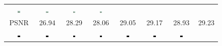 \documentclass[10pt,twocolumn,letterpaper]{article}
\begin{document}
\begin{figure} [tb]
\begin{tabular*}{\textwidth}{cccccccc}
 \includegraphics[width=0.12\textwidth]{fig/ed/42049[5-SRCNN].jpg} &
    \includegraphics[width=0.12\textwidth]{fig/ed/42049[6-A+].jpg} &
    \includegraphics[width=0.12\textwidth]{fig/ed/42049[7-JOR].jpg} &
    \includegraphics[width=0.12\textwidth]{fig/ed/42049[8-SRF].jpg} \\
    PSNR & 26.94 & 28.29 & 28.06 & 29.05 & 29.17 & 28.93 & 29.23 \\
 \includegraphics[width=0.12\textwidth]{fig/ed/42049[1-Original]_cbd.jpg} &
 \includegraphics[width=0.12\textwidth]{fig/ed/42049[2-Bicubic]_cbd.jpg} &
 \includegraphics[width=0.12\textwidth]{fig/ed/42049[3-Zeyde]_cbd.jpg} &
 \includegraphics[width=0.12\textwidth]{fig/ed/42049[4-ANR]_cbd.jpg} &
 \includegraphics[width=0.12\textwidth]{fig/ed/42049[5-SRCNN]_cbd.jpg} &
 \includegraphics[width=0.12\textwidth]{fig/ed/42049[6-A+]_cbd.jpg} &
 \includegraphics[width=0.12\textwidth]{fig/ed/42049[7-JOR]_cbd.jpg} &

\end{tabular*}
\end{figure}
\end{document}

